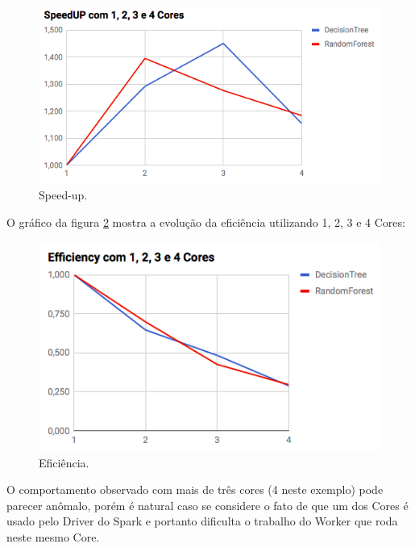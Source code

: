 \documentclass[12pt]{article}
\begin{document}
\begin{figure}[!ht]
	\centering
	\begin{minipage}[t]{0.55\textwidth}
        \includegraphics[width=\textwidth]{img/speed-up.png}
        \centering
	\end{minipage}
	\caption
	{
	   Speed-up.
	}
	\label{fig:speedup}
\end{figure}

O gráfico da figura \ref{fig:efficiency} mostra a evolução da eficiência utilizando 1, 2, 3 e 4 Cores:

\begin{figure}[!ht]
	\centering
	\begin{minipage}[t]{0.55\textwidth}
        \includegraphics[width=\textwidth]{img/efficiency.png}
        \centering
	\end{minipage}
	\caption
	{
	   Eficiência.
	}
	\label{fig:efficiency}
\end{figure}

O comportamento observado com mais de três cores (4 neste exemplo) pode parecer anômalo, porém é natural caso se considere o fato de que um dos Cores é usado pelo Driver do Spark e portanto dificulta o trabalho do Worker que roda neste mesmo Core.
\end{document}
